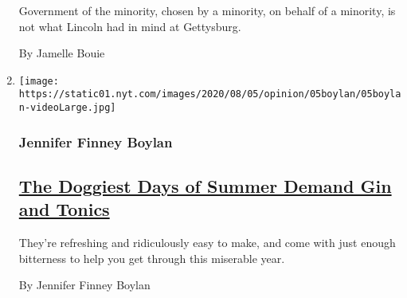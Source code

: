 \begin{enumerate}
  Government of the minority, chosen by a minority, on behalf of a
  minority, is not what Lincoln had in mind at Gettysburg.

  By Jamelle Bouie
\item
  \texttt{[image: https://static01.nyt.com/images/2020/08/05/opinion/05boylan/05boylan-videoLarge.jpg]}

  \hypertarget{jennifer-finney-boylan}{%
  \subsubsection{Jennifer Finney Boylan}\label{jennifer-finney-boylan}}

  \hypertarget{the-doggiest-days-of-summer-demand-gin-and-tonics}{%
  \subsection{\texorpdfstring{\href{/2020/08/04/opinion/gin-tonic-summer-drink.html}{The
  Doggiest Days of Summer Demand Gin and
  Tonics}}{The Doggiest Days of Summer Demand Gin and Tonics}}\label{the-doggiest-days-of-summer-demand-gin-and-tonics}}

  They're refreshing and ridiculously easy to make, and come with just
  enough bitterness to help you get through this miserable year.

  By Jennifer Finney Boylan
\end{enumerate}


